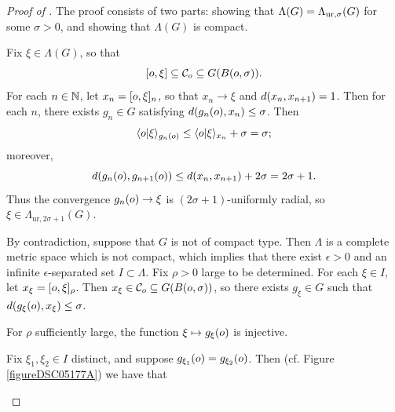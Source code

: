 \begin{proof}[Proof of ]
The proof consists of two parts: showing that $\Lambda(G) = \Lursigma(G)$ for some $\sigma > 0$, and showing that $\Lambda(G)$ is compact.

\begin{subproof}[Proof that $\Lambda(G) = \Lursigma(G)$ for some $\sigma > 0$]
Fix $\xi\in\Lambda(G)$, so that 
\[
[o,\xi] \subseteq \mathcal C_o \subseteq G(B(o,\sigma)).
\] 
For each $n\in\N$, let $x_n = [o,\xi]_n$, so that $x_n\to\xi$ and $d(x_n,x_{n + 1}) = 1$. Then for each $n$, there exists $g_n\in G$ satisfying $d(g_n(o),x_n) \leq \sigma$. Then
\[
\langle o|\xi\rangle_{g_n(o)} \leq \langle o|\xi\rangle_{x_n} + \sigma = \sigma;
\]
moreover,
\[
d(g_n(o),g_{n + 1}(o)) \leq d(x_n,x_{n + 1}) + 2\sigma = 2\sigma + 1.
\]
Thus the convergence $g_n(o)\to \xi$ is $(2\sigma + 1)$-uniformly radial, so $\xi\in\Lambda_{\text{ur},2\sigma + 1}(G)$.
\end{subproof}
\begin{subproof}
By contradiction, suppose that $G$ is not of compact type. Then $\Lambda$ is a complete metric space which is not compact, which implies that there exist $\epsilon > 0$ and an infinite $\epsilon$-separated set $I\subset\Lambda$. Fix $\rho > 0$ large to be determined. For each $\xi\in I$, let $x_\xi = [o,\xi]_\rho$. Then $x_\xi\in\mathcal C_o \subseteq G(B(o,\sigma))$, so there exists $g_\xi\in G$ such that $d(g_\xi(o),x_\xi)\leq \sigma$.
\begin{claim}
\label{claiminjectiveCCB}
For $\rho$ sufficiently large, the function $\xi \mapsto g_\xi (o)$ is injective.
\end{claim}
\begin{subproof}
Fix $\xi_1,\xi_2\in I$ distinct, and suppose $g_{\xi_1}(o) = g_{\xi_2}(o)$. Then (cf. Figure \ref{figureDSC05177A}) we have that 
\begin{figure}
\begin{center}
\end{center}
\end{figure}
\end{subproof}
\end{subproof}
\end{proof}
